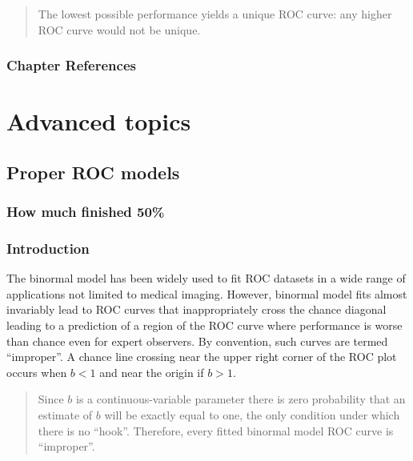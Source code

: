 \documentclass[
]{book}
\begin{document}
\begin{quote}
The lowest possible performance yields a unique ROC curve: any higher ROC curve would not be unique.
\end{quote}

\hypertarget{binormal-model-references}{%
\section{Chapter References}\label{binormal-model-references}}

\hypertarget{part-advanced-topics}{%
\part*{Advanced topics}\label{part-advanced-topics}}

\hypertarget{proper-roc-models}{%
\chapter{Proper ROC models}\label{proper-roc-models}}

\hypertarget{proper-roc-models-how-much-finished}{%
\section{How much finished 50\%}\label{proper-roc-models-how-much-finished}}

\hypertarget{proper-roc-models-introduction}{%
\section{Introduction}\label{proper-roc-models-introduction}}

The binormal model has been widely used to fit ROC datasets in a wide range of applications not limited to medical imaging. However, binormal model fits almost invariably lead to ROC curves that inappropriately cross the chance diagonal leading to a prediction of a region of the ROC curve where performance is worse than chance even for expert observers. By convention, such curves are termed ``improper''. A chance line crossing near the upper right corner of the ROC plot occurs when \(b < 1\) and near the origin if \(b > 1\).

\begin{quote}
Since \(b\) is a continuous-variable parameter there is zero probability that an estimate of \(b\) will be exactly equal to one, the only condition under which there is no ``hook''. Therefore, every fitted binormal model ROC curve is ``improper''.
\end{quote}
\end{document}
